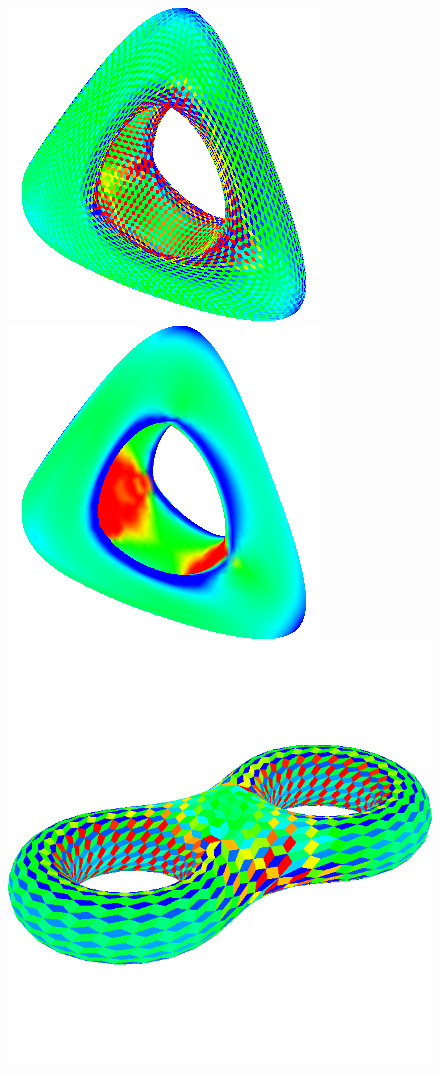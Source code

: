 \begin{figure}[!h]
    \centering
    \centering
    \includegraphics[scale=0.7]{images/genus-mce.png}
    \endminipage\hfill
    \centering
    \centering
    \includegraphics[scale=0.7]{images/genus-mcv.png}
    \endminipage\hfill
    \centering
    \includegraphics[scale=0.45]{images/eight-mce.png}

\end{figure}
